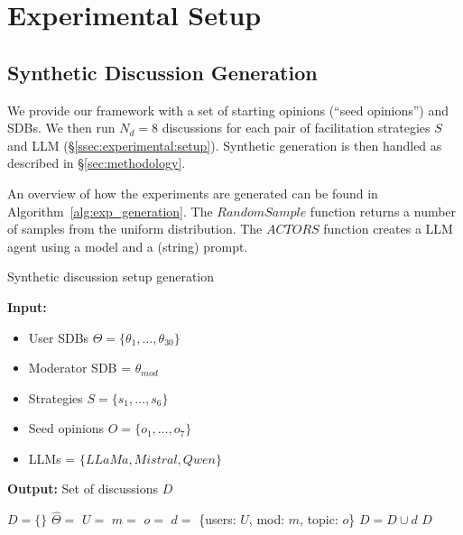 \section{Experimental Setup}
\label{sec:experimental}

\subsection{Synthetic Discussion Generation}
\label{ssec:appendix:discussion}

We provide our framework with a set of starting opinions (``seed opinions'') and SDBs. We then run $N_d=8$ discussions for each pair of facilitation strategies $S$ and LLM (\S\ref{ssec:experimental:setup}). Synthetic generation is then handled as described in \S\ref{sec:methodology}.

An overview of how the experiments are generated can be found in Algorithm~\ref{alg:exp_generation}.  The $RandomSample$ function returns a number of samples from the uniform distribution. The $ACTORS$ function creates a LLM agent using a model and a (string) prompt.

\begin{algorithm}[t]
	\caption{Synthetic discussion setup generation}
	\label{alg:exp_generation}
	\hspace*{\algorithmicindent} \textbf{Input:} 
	\begin{itemize}[noitemsep, nosep]
		\item User SDBs $\Theta = \{\theta_1, \dots, \theta_{30}\}$
		\item Moderator SDB = $\theta_{mod}$
		\item Strategies $S = \{s_1, \ldots, s_6\}$
		\item Seed opinions $O = \{o_1, \ldots, o_7\}$
		\item LLMs = $\{LLaMa, Mistral, Qwen\}$
	\end{itemize}
	\hspace*{\algorithmicindent} \textbf{Output:} Set of discussions $D$
	\begin{algorithmic}[1]
		\State $D = \{\}$
		\State $\hat{\Theta} = $ 
		\State $U =$  
		\State $m = $ 
		\State $o = $ 
		\State $d =$ \{users: $U$, mod: $m$, topic: $o$\}
		\State $D = D \cup d$
		\EndFor
		\EndFor
		\EndFor
		\State \Return $D$
	\end{algorithmic}
\end{algorithm}

